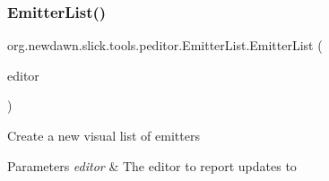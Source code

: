 \subsubsection{\texorpdfstring{Emitter\+List()}{EmitterList()}}
{\footnotesize\ttfamily org.\+newdawn.\+slick.\+tools.\+peditor.\+Emitter\+List.\+Emitter\+List (\begin{DoxyParamCaption}\item[{final \mbox{\hyperlink{classorg_1_1newdawn_1_1slick_1_1tools_1_1peditor_1_1_particle_editor}{Particle\+Editor}}}]{editor }\end{DoxyParamCaption})\hspace{0.3cm}{\ttfamily [inline]}}

Create a new visual list of emitters


\begin{DoxyParams}{Parameters}
{\em editor} & The editor to report updates to \\
\hline
\end{DoxyParams}

